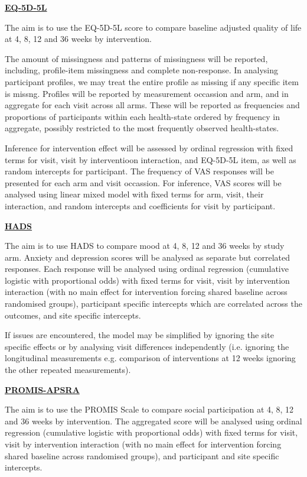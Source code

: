 \documentclass[11pt,parskip=half-]{scrartcl}
\begin{document}
\label{analysis:eq5d5l}
\hyperref[outcome:eq5d5l]{\textbf{EQ-5D-5L}}

The aim is to use the EQ-5D-5L score to compare baseline adjusted quality of life at 4, 8, 12 and 36 weeks by intervention.

The amount of missingness and patterns of missingness will be reported, including, profile-item missingness and complete non-response. In analysing participant profiles, we may treat the entire profile as missing if any specific item is missng. Profiles will be reported by measurement occassion and arm, and in aggregate for each visit across all arms. These will be reported as frequencies and proportions of participants within each health-state ordered by frequency in aggregate, possibly restricted to the most frequently observed health-states.

Inference for intervention effect will be assessed by ordinal regression with fixed terms for visit, visit by interventioon interaction, and EQ-5D-5L item, as well as random intercepts for participant. The frequency of VAS responses will be presented for each arm and visit occassion. For inference, VAS scores will be analysed using linear mixed model with fixed terms for arm, visit, their interaction, and random intercepts and coefficients for visit by participant.

\label{analysis:hads}
\hyperref[outcome:hads]{\textbf{HADS}}

The aim is to use HADS to compare mood at 4, 8, 12 and 36 weeks by study arm. Anxiety and depression scores will be analysed as separate but correlated responses. Each response will be analysed using ordinal regression (cumulative logistic with proportional odds) with fixed terms for visit, visit by intervention interaction (with no main effect for intervention forcing shared baseline across randomised groups), participant specific intercepts which are correlated across the outcomes, and site specific intercepts.

If issues are encountered, the model may be simplified by ignoring the site specific effects or by analysing visit differences independently (i.e. ignoring the longitudinal measurements e.g. comparison of interventions at 12 weeks ignoring the other repeated measurements).

\label{analysis:promis-aspra}
\hyperref[outcome:promis-apsra]{\textbf{PROMIS-APSRA}}

The aim is to use the PROMIS Scale to compare social participation at 4, 8, 12 and 36 weeks by intervention. The aggregated score will be analysed using ordinal regression (cumulative logistic with proportional odds)  with fixed terms for visit, visit by intervention interaction (with no main effect for intervention forcing shared baseline across randomised groups), and participant and site specific  intercepts.
\end{document}
